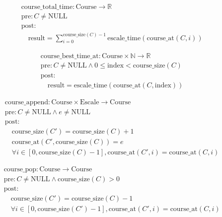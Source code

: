 \[
\begin{aligned}
&\text{course\_total\_time}: \text{Course} \to \mathbb{R} \\
&\text{pre}: C \neq \text{NULL} \\
&\text{post}: \\
&\quad \text{result} = \sum_{i=0}^{\text{course\_size}(C)-1} \text{escale\_time}(\text{course\_at}(C, i))
\end{aligned}
\]





\[
\begin{aligned}
&\text{course\_best\_time\_at}: \text{Course} \times \mathbb{N} \to \mathbb{R} \\
&\text{pre}: C \neq \text{NULL} \land 0 \leq \text{index} < \text{course\_size}(C) \\
&\text{post}: \\
&\quad \text{result} = \text{escale\_time}(\text{course\_at}(C, \text{index}))
\end{aligned}
\]





\[
\begin{aligned}
&\text{course\_append}: \text{Course} \times \text{Escale} \to \text{Course} \\
&\text{pre}: C \neq \text{NULL} \land e \neq \text{NULL} \\
&\text{post}: \\
&\quad \text{course\_size}(C') = \text{course\_size}(C) + 1 \\
&\quad \text{course\_at}(C', \text{course\_size}(C)) = e \\
&\quad \forall i \in [0, \text{course\_size}(C)-1], \text{course\_at}(C', i) = \text{course\_at}(C, i)
\end{aligned}
\]





\[
\begin{aligned}
&\text{course\_pop}: \text{Course} \to \text{Course} \\
&\text{pre}: C \neq \text{NULL} \land \text{course\_size}(C) > 0 \\
&\text{post}: \\
&\quad \text{course\_size}(C') = \text{course\_size}(C) - 1 \\
&\quad \forall i \in [0, \text{course\_size}(C')-1], \text{course\_at}(C', i) = \text{course\_at}(C, i)
\end{aligned}
\]





